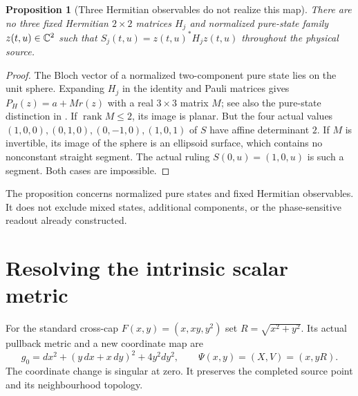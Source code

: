 \documentclass[11pt]{article}
\newtheorem{proposition}[theorem]{Proposition}
\theoremstyle{remark}\newtheorem{remark}[theorem]{Remark}
\DeclareMathOperator{\rank}{rank}
\begin{document}
\begin{proposition}[Three Hermitian observables do not realize this map]\label{prop:hermitian}
There are no three fixed Hermitian $2\times2$ matrices $H_j$ and normalized
pure-state family $z(t,u)\in\mathbb C^2$ such that
$S_j(t,u)=z(t,u)^*H_jz(t,u)$ throughout the physical source.
\end{proposition}
\begin{proof}
The Bloch vector of a normalized two-component pure state lies on the unit
sphere. Expanding $H_j$ in the identity and Pauli matrices gives
$P_H(z)=a+Mr(z)$ with a real $3\times3$ matrix $M$;
see also the pure-state distinction in \cite{bloch}.
If $\rank M\leq2$, its image is planar. But the four actual values
$(1,0,0),(0,1,0),(0,-1,0),(1,0,1)$ of $S$ have affine determinant $2$.
If $M$ is invertible, its image of the sphere is an ellipsoid surface,
which contains no nonconstant straight segment. The actual ruling
$S(0,u)=(1,0,u)$ is such a segment. Both cases are impossible.
\end{proof}
The proposition concerns normalized pure states and fixed Hermitian
observables. It does not exclude mixed states, additional components, or
the phase-sensitive readout already constructed.

\section{Resolving the intrinsic scalar metric}\label{sec:resolved}
For the standard cross-cap $F(x,y)=(x,xy,y^2)$ set $R=\sqrt{x^2+y^2}$.
Its actual pullback metric and a new coordinate map are
\[
 g_0=dx^2+(y\,dx+x\,dy)^2+4y^2dy^2,
 \qquad \Psi(x,y)=(X,V)=(x,yR).
\]
The coordinate change is singular at zero. It preserves the completed
source point and its neighbourhood topology.
\end{document}
